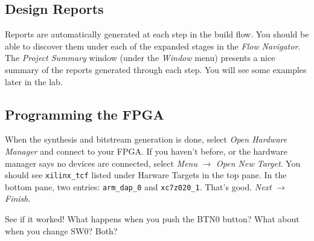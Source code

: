 \documentclass[11pt]{article}
\begin{document}
\subsection{Design Reports}
Reports are automatically generated at each step in the build flow. You should be able to discover them under each of the expanded stages in the \emph{Flow Navigator}. The \emph{Project Summary} window (under the \emph{Window} menu) presents a nice summary of the reports generated through each step. You will see some examples later in the lab.

\subsection{Programming the FPGA}

 When the synthesis and bitstream generation is done, select \emph{Open Hardware Manager} and connect to your FPGA. If you haven't before, or the hardware manager says no devices are connected, select \emph{Menu} $\rightarrow$ \emph{Open New Target}. You should see \verb|xilinx_tcf| listed under Harware Targets in the top pane. In the bottom pane, two entries: \verb|arm_dap_0| and \verb|xc7z020_1|. That's good. \emph{Next} $\rightarrow$ \emph{Finish}.
 
 See if it worked! What happens when you push the BTN0 button? What about when you change SW0? Both?
\end{document}
